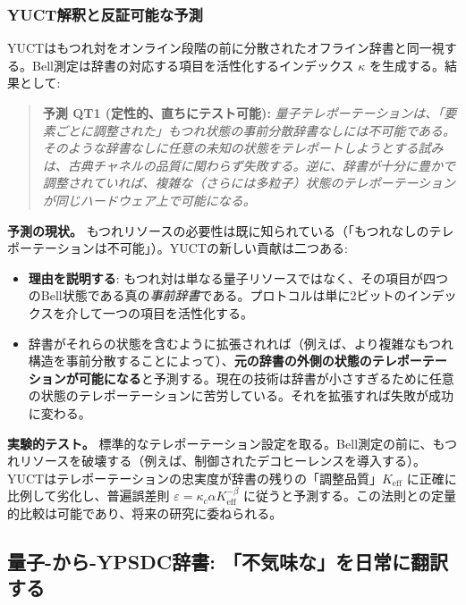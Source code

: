 \documentclass[12pt,a4paper]{article}
\theoremstyle{definition}
\theoremstyle{remark}
\begin{document}
	\subsubsection{YUCT解釈と反証可能な予測}
	
	YUCTはもつれ対をオンライン段階の前に分散されたオフライン辞書と同一視する。Bell測定は辞書の対応する項目を活性化するインデックス $\kappa$ を生成する。結果として:
	
	\begin{quote}
		\textbf{予測 QT1 (定性的、直ちにテスト可能):}
		\emph{量子テレポーテーションは、「要素ごとに調整された」もつれ状態の事前分散辞書なしには不可能である。そのような辞書なしに任意の未知の状態をテレポートしようとする試みは、古典チャネルの品質に関わらず失敗する。逆に、辞書が十分に豊かで調整されていれば、複雑な（さらには多粒子）状態のテレポーテーションが同じハードウェア上で可能になる。}
	\end{quote}
	
	\textbf{予測の現状。}
	もつれリソースの必要性は既に知られている（「もつれなしのテレポーテーションは不可能」）。YUCTの新しい貢献は二つある:
	
	\begin{itemize}
		\item \textbf{理由を説明する}: もつれ対は単なる量子リソースではなく、その項目が四つのBell状態である真の\emph{事前辞書}である。プロトコルは単に2ビットのインデックスを介して一つの項目を活性化する。
		\item 辞書がそれらの状態を含むように拡張されれば（例えば、より複雑なもつれ構造を事前分散することによって）、\textbf{元の辞書の外側の状態のテレポーテーションが可能になる}と予測する。現在の技術は辞書が小さすぎるために任意の状態のテレポーテーションに苦労している。それを拡張すれば失敗が成功に変わる。
	\end{itemize}
	
	\textbf{実験的テスト。}
	標準的なテレポーテーション設定を取る。Bell測定の前に、もつれリソースを破壊する（例えば、制御されたデコヒーレンスを導入する）。YUCTはテレポーテーションの忠実度が辞書の残りの「調整品質」$K_{\mathrm{eff}}$ に正確に比例して劣化し、普遍誤差則 $\varepsilon = \kappa_c \alpha K_{\mathrm{eff}}^{-\beta}$ に従うと予測する。この法則との定量的比較は可能であり、将来の研究に委ねられる。
	
	\subsection{量子-から-YPSDC辞書: 「不気味な」を日常に翻訳する}
	
\end{document}
